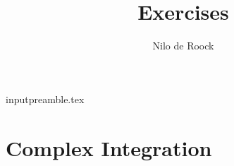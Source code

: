 input{preamble.tex}

%
%
\title{Exercises}
\author{Nilo de Roock}
\date{\Date}


    \maketitle

    \tableofcontents{}

    \newpage
    \thispagestyle{empty}
    \chapter{Complex Integration}







